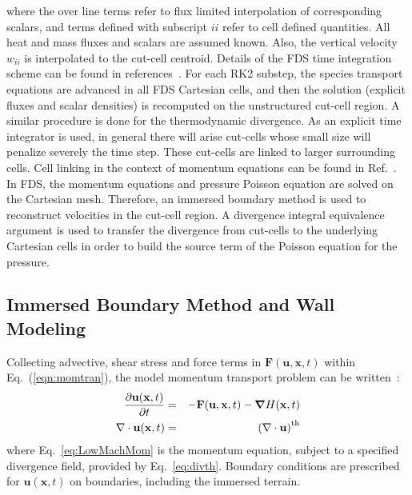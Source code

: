 \documentclass[journal,article,atmosphere,submit,moreauthors,pdftex]{Definitions_Review_Process/mdpi}
\begin{document}
where the over line terms refer to flux limited interpolation of corresponding scalars, and terms defined with subscript $ii$ refer to cell defined quantities. All heat and mass fluxes and scalars are assumed known. Also, the vertical velocity $w_{ii}$ is interpolated to the cut-cell centroid. Details of the FDS time integration scheme can be found in references~\cite{FDS_Users_Guide,mcdermo_2014}. For each RK2 substep, the species transport equations are advanced in all FDS Cartesian cells, and then the solution (explicit fluxes and scalar densities) is recomputed on the unstructured cut-cell region. A similar procedure is done for the thermodynamic divergence.
As an explicit time integrator is used, in general there will arise cut-cells whose small size will penalize severely the time step. These cut-cells are linked to larger surrounding cells. Cell linking in the context of momentum equations can be found in Ref.~\cite{kirk_2003}. In FDS, the momentum equations and pressure Poisson equation are solved on the Cartesian mesh. Therefore, an immersed boundary method is used to reconstruct velocities in the cut-cell region. A divergence integral equivalence argument is used to transfer the divergence from cut-cells to the underlying Cartesian cells in order to build the source term of the Poisson equation for the pressure.


\subsection{Immersed Boundary Method and Wall Modeling}

Collecting advective, shear stress and force terms in $\mathbf{F}(\mathbf{u},\mathbf{x},t)$ within Eq.~(\ref{eqn:momtran}), the model momentum transport problem can be written~\cite{FDS_Users_Guide}:
\begin{eqnarray}
  \frac{\partial \mathbf{u}(\mathbf{x},t)}{\partial t} &=& - \mathbf{F}(\mathbf{u},\mathbf{x},t) - \boldsymbol{\nabla} H(\mathbf{x},t)  \label{eq:LowMachMom} \\
         \nabla \cdot \mathbf{u} (\mathbf{x},t) & = & \left(\nabla \cdot \mathbf{u} \right)^{\rm th} \label{eq:LowMachDiv}
\end{eqnarray}
where Eq.~\eqref{eq:LowMachMom} is the momentum equation, subject to a specified divergence field, provided by Eq.~\eqref{eq:divth}.
Boundary conditions are prescribed for $\mathbf{u}(\mathbf{x},t)$ on boundaries, including the immersed terrain.
\end{document}
